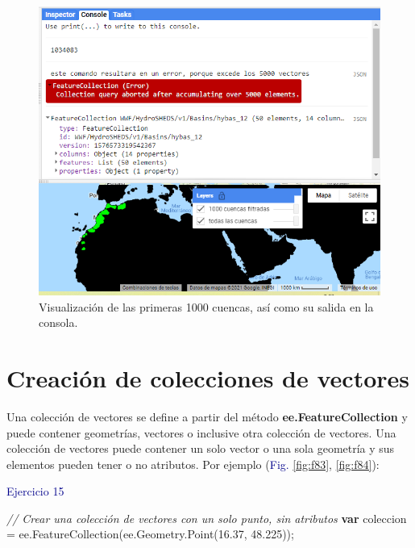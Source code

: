 \documentclass[
  12pt,
  letterpaper,
  twoside]{book}
\newenvironment{Shaded}{\begin{snugshade}}{\end{snugshade}}
\newcommand{\AttributeTok}[1]{\textcolor[rgb]{0.48,0.12,0.64}{#1}}
\newcommand{\CommentTok}[1]{\textcolor[rgb]{0.24,0.58,0.00}{\textit{#1}}}
\newcommand{\FloatTok}[1]{\textcolor[rgb]{0.28,0.53,0.93}{#1}}
\newcommand{\FunctionTok}[1]{\textcolor[rgb]{0.48,0.12,0.64}{#1}}
\newcommand{\KeywordTok}[1]{\textcolor[rgb]{0.00,0.00,0.00}{\textbf{#1}}}
\newcommand{\NormalTok}[1]{#1}
\newcommand{\OperatorTok}[1]{\textcolor[rgb]{0.00,0.00,0.00}{#1}}
\newcommand\boldpurple[1]{\textcolor{darkpurple}{\textbf{#1}}}
\begin{document}
\begin{figure}[H]

{\centering \includegraphics[width=0.95\linewidth]{Img/ej14} 

}

\caption{Visualización de las primeras 1000 cuencas, así como su salida en la consola.}\label{fig:f82}
\end{figure}

\hypertarget{creaciuxf3n-de-colecciones-de-vectores}{%
\section{Creación de colecciones de vectores}\label{creaciuxf3n-de-colecciones-de-vectores}}

Una colección de vectores se define a partir del método \boldpurple{ee.FeatureCollection} y puede contener geometrías, vectores o inclusive otra colección de vectores. Una colección de vectores puede contener un solo vector o una sola geometría y sus elementos pueden tener o no atributos. Por ejemplo (\textcolor{darkblue}{Fig.} \ref{fig:f83}, \ref{fig:f84}):

\textcolor{darkblue}{Ejercicio 15}

\begin{Shaded}
\begin{Highlighting}[]
\CommentTok{// Crear una colección de vectores con un solo punto, sin atributos }
\KeywordTok{var}\NormalTok{ coleccion }\OperatorTok{=}\NormalTok{ ee}\OperatorTok{.}\FunctionTok{FeatureCollection}\NormalTok{(ee}\OperatorTok{.}\AttributeTok{Geometry}\OperatorTok{.}\FunctionTok{Point}\NormalTok{(}\FloatTok{16.37}\OperatorTok{,} \FloatTok{48.225}\NormalTok{))}\OperatorTok{;}
\end{Highlighting}
\end{Shaded}
\end{document}
